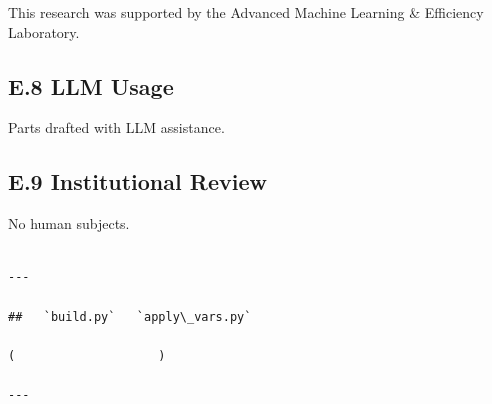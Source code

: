 This research was supported by the Advanced Machine Learning \& Efficiency Laboratory.

\subsection{E.8 LLM Usage}

Parts drafted with LLM assistance.

\subsection{E.9 Institutional Review}

No human subjects.
\begin{lstlisting}

---

##   `build.py`   `apply\_vars.py`

(                    )

---
\end{lstlisting}

